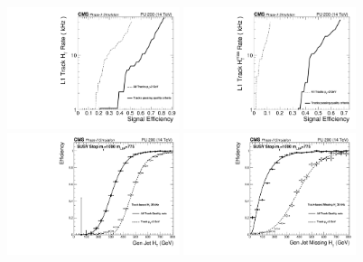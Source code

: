 \begin{figure}[htbp!]
\includegraphics[width=0.45\textwidth ]{SignalEfficiencyVsRate_TkHT.pdf}
\includegraphics[width=0.45\textwidth ]{SignalEfficiencyVsRate_TkMHT.pdf}\\
\includegraphics[width=0.45\textwidth ]{TurnOnTrackHT.pdf}
\includegraphics[width=0.45\textwidth ]{TurnOnTrackMHT.pdf}

\caption{}
\label{fig:TkPurityImprov}
\end{figure}


